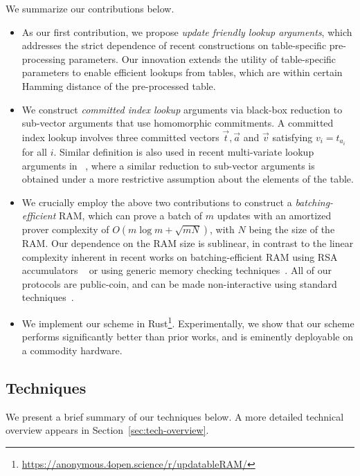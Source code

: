 We summarize our contributions below.
\begin{itemize}[leftmargin=2em]
	\item As our first contribution, we propose {\em update friendly lookup arguments}, which addresses
	the strict dependence of recent constructions on table-specific pre-processing parameters. Our
	innovation extends the utility of table-specific parameters to enable efficient lookups from tables,
	which are within certain Hamming distance of the pre-processed table.
	\item We construct {\em committed index lookup} arguments via black-box reduction to
	sub-vector arguments that use homomorphic commitments. A committed index lookup involves
	three committed vectors $\vec{t},\vec{a}$ and $\vec{v}$ satisfying $v_i=t_{a_i}$ for all $i$. Similar
	definition is also used in recent multi-variate lookup arguments in ~\cite{lasso}, where a similar reduction
	to sub-vector arguments is obtained under a more restrictive assumption about the elements of the table.
	\item We crucially employ the above two contributions to construct a {\em batching-efficient} RAM, which
	can prove a batch of $m$ updates with an amortized prover complexity of $O(m\log m + \sqrt{mN})$,
	with $N$ being the size of the RAM. Our dependence on the RAM size is sublinear, in contrast to the linear complexity
	inherent in recent works on batching-efficient RAM using RSA accumulators ~\cite{USENIX:OWWB20,CCS:CFHKKO22} or using generic memory checking techniques~\cite{NDSS:WSRBW15,USENIX:BCTV14,C:BCGTV13,SP:ZGKPP18}. All of our protocols are public-coin, and can be made non-interactive using standard techniques~\cite{C:FiaSha86}. 
	
	\item We implement our scheme in Rust\footnote{\url{https://anonymous.4open.science/r/updatableRAM/}}.
	Experimentally, we show that our scheme performs significantly better than prior works,
	and is eminently deployable on a commodity hardware.
\end{itemize}


\subsection{Techniques}\label{subsec:techniques}

We present a brief summary of our techniques below. A more detailed technical overview appears in Section~\ref{sec:tech-overview}.

\smallskip

